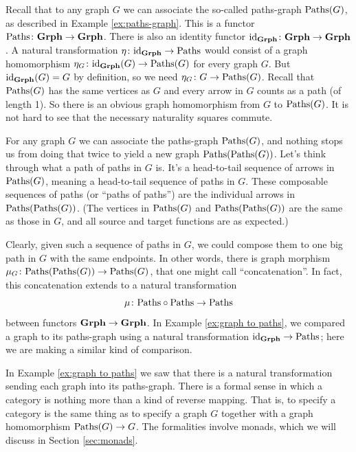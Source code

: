 \begin{example}\label{ex:graph to paths}

Recall that to any graph $G$ we can associate the so-called paths-graph $\textnormal{Paths}(G)$, as described in Example \ref{ex:paths-graph}. This is a functor $\textnormal{Paths}\colon{\bf Grph}\rightarrow{\bf Grph}$. There is also an identity functor $\textnormal{id}_{{\bf Grph}}\colon{\bf Grph}\rightarrow{\bf Grph}$. A natural transformation $\eta\colon\textnormal{id}_{\bf Grph}\rightarrow\textnormal{Paths}$ would consist of a graph homomorphism $\eta_G\colon \textnormal{id}_{\bf Grph}(G)\rightarrow\textnormal{Paths}(G)$ for every graph $G$. But $\textnormal{id}_{\bf Grph}(G)=G$ by definition, so we need $\eta_G\colon G\rightarrow\textnormal{Paths}(G)$. Recall that $\textnormal{Paths}(G)$ has the same vertices as $G$ and every arrow in $G$ counts as a path (of length 1). So there is an obvious graph homomorphism from $G$ to $\textnormal{Paths}(G)$. It is not hard to see that the necessary naturality squares commute.

\end{example}

\begin{example}\label{ex:concat paths of paths}

For any graph $G$ we can associate the paths-graph $\textnormal{Paths}(G)$, and nothing stops us from doing that twice to yield a new graph $\textnormal{Paths}(\textnormal{Paths}(G))$. Let's think through what a path of paths in $G$ is. It's a head-to-tail sequence of arrows in $\textnormal{Paths}(G)$, meaning a head-to-tail sequence of paths in $G$. These composable sequences of paths (or “paths of paths”) are the individual arrows in $\textnormal{Paths}(\textnormal{Paths}(G))$. (The vertices in $\textnormal{Paths}(G)$ and $\textnormal{Paths}(\textnormal{Paths}(G))$ are the same as those in $G$, and all source and target functions are as expected.)

Clearly, given such a sequence of paths in $G$, we could compose them to one big path in $G$ with the same endpoints. In other words, there is graph morphism $\mu_G\colon\textnormal{Paths}(\textnormal{Paths}(G))\rightarrow\textnormal{Paths}(G)$, that one might call “concatenation”. In fact, this concatenation extends to a natural transformation $$\mu\colon\textnormal{Paths}\circ\textnormal{Paths}\rightarrow\textnormal{Paths}$$ between functors ${\bf Grph}\rightarrow{\bf Grph}$. In Example \ref{ex:graph to paths}, we compared a graph to its paths-graph using a natural transformation $\textnormal{id}_{{\bf Grph}}\rightarrow\textnormal{Paths}$; here we are making a similar kind of comparison.

\end{example}

\begin{remark}

In Example \ref{ex:graph to paths} we saw that there is a natural transformation sending each graph into its paths-graph. There is a formal sense in which a category is nothing more than a kind of reverse mapping. That is, to specify a category is the same thing as to specify a graph $G$ together with a graph homomorphism $\textnormal{Paths}(G)\rightarrow G$. The formalities involve monads, which we will discuss in Section \ref{sec:monads}.

\end{remark}

